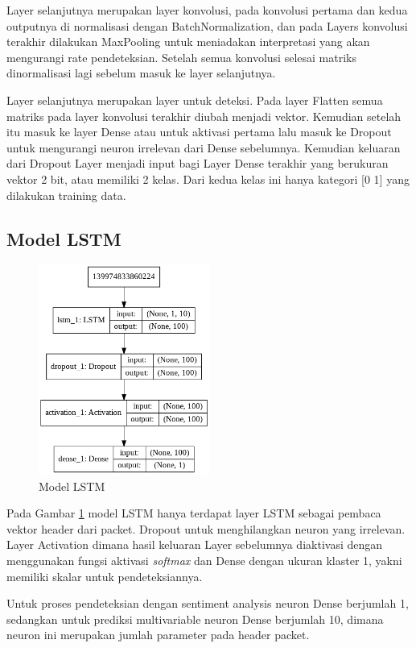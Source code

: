 \documentclass[./skripsi.tex]{subfiles}
\begin{document}
\par Layer selanjutnya merupakan layer konvolusi, pada konvolusi pertama dan kedua outputnya di normalisasi dengan BatchNormalization, dan pada Layers konvolusi terakhir dilakukan MaxPooling untuk meniadakan interpretasi yang akan mengurangi rate pendeteksian. Setelah semua konvolusi selesai matriks dinormalisasi lagi sebelum masuk ke layer selanjutnya.
\par Layer selanjutnya merupakan layer untuk deteksi. Pada layer Flatten semua matriks pada layer konvolusi terakhir diubah menjadi vektor. Kemudian setelah itu masuk ke layer Dense atau untuk aktivasi pertama lalu masuk ke Dropout untuk mengurangi neuron irrelevan dari Dense sebelumnya. Kemudian keluaran dari Dropout Layer menjadi input bagi Layer Dense terakhir yang berukuran vektor 2 bit, atau memiliki 2 kelas. Dari kedua kelas ini hanya kategori [0 1] yang dilakukan training data.
\subsection{Model LSTM}
\begin{figure}%
    \centering
    \includegraphics[width=0.5\textwidth]{public/assets/img/LSTMModel.png}
    \caption{Model LSTM}
    \label{fig:lstm_model}
\end{figure}
\par Pada Gambar \ref{fig:lstm_model} model LSTM hanya terdapat layer LSTM sebagai pembaca vektor header dari packet. Dropout untuk menghilangkan neuron yang irrelevan. Layer Activation dimana hasil keluaran Layer sebelumnya diaktivasi dengan menggunakan fungsi aktivasi \textit{softmax} dan Dense dengan ukuran klaster 1, yakni memiliki skalar untuk pendeteksiannya.
\par Untuk proses pendeteksian dengan sentiment analysis neuron Dense berjumlah 1, sedangkan untuk prediksi multivariable neuron Dense berjumlah 10, dimana neuron ini merupakan jumlah parameter pada header packet.
\end{document}
